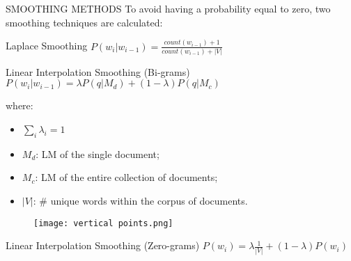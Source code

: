 \begin{frame}{SMOOTHING METHODS}
    To avoid having a probability equal to zero, two smoothing techniques are calculated:
    \begin{minipage}{\linewidth}
        \centering
        \begin{minipage}{0.45\linewidth}
            \begin{block}{\centering Laplace Smoothing}
                \centering\small $ P(w_i|w_{i-1}) = \frac{count(w_{i-1})+1}{count(w_{i-1})+|V|} $
            \end{block}
        \end{minipage}
        \hspace{0.05\linewidth}
        \begin{minipage}{0.45\linewidth}
            \begin{block}{\centering Linear Interpolation Smoothing (Bi-grams)}
                \centering \scriptsize $ P(w_i|w_{i-1}) = \lambda P(q|M_d) + (1-\lambda)P(q|M_c) $
            \end{block}
        \end{minipage}
    \end{minipage}
    \begin{minipage}{\linewidth}
        \centering
        \begin{minipage}{0.45\linewidth}
            where:
            \begin{itemize}
                \item $\sum_i \lambda_i = 1$
                \item $M_d$: LM of the single document;
                \item $M_c$: LM of the entire collection of documents;
                \item $|V|$: \# unique words within the corpus of documents.
            \end{itemize}
        \end{minipage}
        \hspace{0.05\linewidth}
        \begin{minipage}{0.45\linewidth}
            \begin{figure}[H]
                \centering
                \texttt{[image: vertical points.png]}
                \centering
            \end{figure}
            \begin{block}{\centering Linear Interpolation Smoothing (Zero-grams)\footnotemark[3]}
                \centering \small $ P(w_i) = \lambda \frac{1}{|V|} + (1-\lambda)P(w_i) $
            \end{block}
        \end{minipage}
    \end{minipage}
\end{frame}

